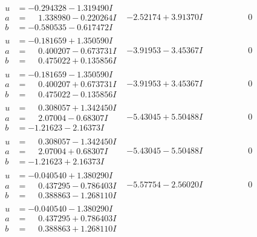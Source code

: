\documentclass[1p]{elsarticle_modified}
\theoremstyle{definition}
\begin{document}
$$\begin{array}{c|c|c}
\begin{aligned}
u &= -0.294328 - 1.319490 I \\
a &= \phantom{-}1.338980 - 0.220264 I \\
b &= -0.580535 - 0.617472 I\end{aligned}
 & -2.52174 + 3.91370 I & \phantom{-0.000000 } 0 \\ \hline\begin{aligned}
u &= -0.181659 + 1.350590 I \\
a &= \phantom{-}0.400207 - 0.673731 I \\
b &= \phantom{-}0.475022 + 0.135856 I\end{aligned}
 & -3.91953 - 3.45367 I & \phantom{-0.000000 } 0 \\ \hline\begin{aligned}
u &= -0.181659 - 1.350590 I \\
a &= \phantom{-}0.400207 + 0.673731 I \\
b &= \phantom{-}0.475022 - 0.135856 I\end{aligned}
 & -3.91953 + 3.45367 I & \phantom{-0.000000 } 0 \\ \hline\begin{aligned}
u &= \phantom{-}0.308057 + 1.342450 I \\
a &= \phantom{-}2.07004 - 0.68307 I \\
b &= -1.21623 - 2.16373 I\end{aligned}
 & -5.43045 + 5.50488 I & \phantom{-0.000000 } 0 \\ \hline\begin{aligned}
u &= \phantom{-}0.308057 - 1.342450 I \\
a &= \phantom{-}2.07004 + 0.68307 I \\
b &= -1.21623 + 2.16373 I\end{aligned}
 & -5.43045 - 5.50488 I & \phantom{-0.000000 } 0 \\ \hline\begin{aligned}
u &= -0.040540 + 1.380290 I \\
a &= \phantom{-}0.437295 - 0.786403 I \\
b &= \phantom{-}0.388863 - 1.268110 I\end{aligned}
 & -5.57754 - 2.56020 I & \phantom{-0.000000 } 0 \\ \hline\begin{aligned}
u &= -0.040540 - 1.380290 I \\
a &= \phantom{-}0.437295 + 0.786403 I \\
b &= \phantom{-}0.388863 + 1.268110 I\end{aligned}

\end{array}$$
\end{document}
